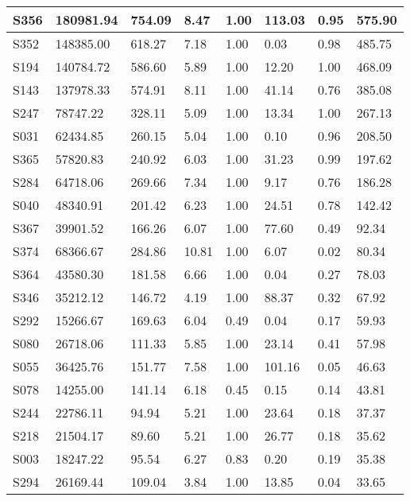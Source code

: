 \documentclass[withoutpreface,bwprint]{cumcmthesis} %
\begin{document}
\begin{longtable}{|l|l|l|l|l|l|l|l|}
        S356 & 180981.94  & 754.09  & 8.47  & 1.00  & 113.03  & 0.95  & 575.90  \\ \hline
        S352 & 148385.00  & 618.27  & 7.18  & 1.00  & 0.03  & 0.98  & 485.75  \\ \hline
        S194 & 140784.72  & 586.60  & 5.89  & 1.00  & 12.20  & 1.00  & 468.09  \\ \hline
        S143 & 137978.33  & 574.91  & 8.11  & 1.00  & 41.14  & 0.76  & 385.08  \\ \hline
        S247 & 78747.22  & 328.11  & 5.09  & 1.00  & 13.34  & 1.00  & 267.13  \\ \hline
        S031 & 62434.85  & 260.15  & 5.04  & 1.00  & 0.10  & 0.96  & 208.50  \\ \hline
        S365 & 57820.83  & 240.92  & 6.03  & 1.00  & 31.23  & 0.99  & 197.62  \\ \hline
        S284 & 64718.06  & 269.66  & 7.34  & 1.00  & 9.17  & 0.76  & 186.28  \\ \hline
        S040 & 48340.91  & 201.42  & 6.23  & 1.00  & 24.51  & 0.78  & 142.42  \\ \hline
        S367 & 39901.52  & 166.26  & 6.07  & 1.00  & 77.60  & 0.49  & 92.34  \\ \hline
        S374 & 68366.67  & 284.86  & 10.81  & 1.00  & 6.07  & 0.02  & 80.34  \\ \hline
        S364 & 43580.30  & 181.58  & 6.66  & 1.00  & 0.04  & 0.27  & 78.03  \\ \hline
        S346 & 35212.12  & 146.72  & 4.19  & 1.00  & 88.37  & 0.32  & 67.92  \\ \hline
        S292 & 15266.67  & 169.63  & 6.04  & 0.49  & 0.04  & 0.17  & 59.93  \\ \hline
        S080 & 26718.06  & 111.33  & 5.85  & 1.00  & 23.14  & 0.41  & 57.98  \\ \hline
        S055 & 36425.76  & 151.77  & 7.58  & 1.00  & 101.16  & 0.05  & 46.63  \\ \hline
        S078 & 14255.00  & 141.14  & 6.18  & 0.45  & 0.15  & 0.14  & 43.81  \\ \hline
        S244 & 22786.11  & 94.94  & 5.21  & 1.00  & 23.64  & 0.18  & 37.37  \\ \hline
        S218 & 21504.17  & 89.60  & 5.21  & 1.00  & 26.77  & 0.18  & 35.62  \\ \hline
        S003 & 18247.22  & 95.54  & 6.27  & 0.83  & 0.20  & 0.19  & 35.38  \\ \hline
        S294 & 26169.44  & 109.04  & 3.84  & 1.00  & 13.85  & 0.04  & 33.65  \\ \hline

\end{longtable}
\end{document}
